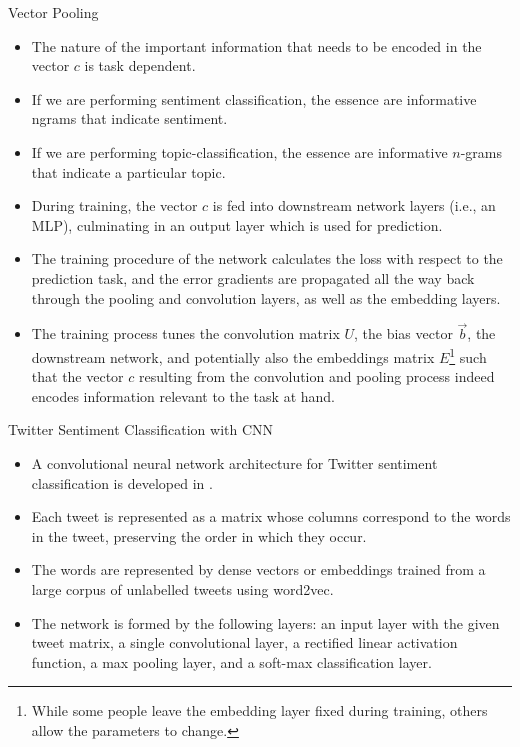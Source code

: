 \documentclass[handout]{beamer}
\begin{document}
\begin{frame}{Vector Pooling}
\begin{scriptsize}
\begin{itemize}
\item The nature of the important information that needs to be encoded in the vector $c$ is task dependent. 
\item If we are performing sentiment classification, the essence are informative ngrams that indicate
sentiment.
\item If we are performing topic-classification, the essence are informative $n$-grams that indicate a particular topic.

\item During training, the vector $c$ is fed into downstream network layers (i.e., an MLP), culminating in an output layer which is used for prediction.
\item The training procedure of the network calculates the loss with respect to the prediction task, and the error gradients are propagated all the way back through the pooling and convolution layers, as well as the embedding layers. 
\item The training process tunes the convolution matrix $U$, the bias vector $\vec{b}$, the downstream network, and
potentially also the embeddings matrix $E$\footnote{While some people leave the embedding layer fixed during training, others allow the parameters to change.}  such that the vector $c$ resulting from the convolution
and pooling process indeed encodes information relevant to the task at hand.
\end{itemize}
\end{scriptsize}
\end{frame}



\begin{frame}{Twitter Sentiment Classification with CNN}
\begin{scriptsize}
\begin{itemize}
\item A convolutional neural network architecture for Twitter sentiment classification is developed in \cite{Severyn2015}.
\item  Each tweet is represented as a matrix whose columns correspond to the words in the tweet, preserving the order in which they occur.
\item  The words are represented by dense vectors or embeddings trained from a large corpus of unlabelled tweets using word2vec.
\item  The network is formed by the following layers: an input layer with the given tweet matrix, a  single  convolutional layer, a rectified linear activation function, a max pooling layer, and a soft-max classification layer.
\end{itemize}
\end{scriptsize}
\end{frame}
\end{document}
